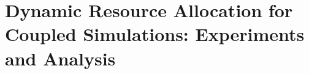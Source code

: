 \documentclass[conference,final]{IEEEtran}
\begin{document}












\section{Dynamic Resource Allocation for Coupled Simulations:
  Experiments and Analysis}
\end{document}
